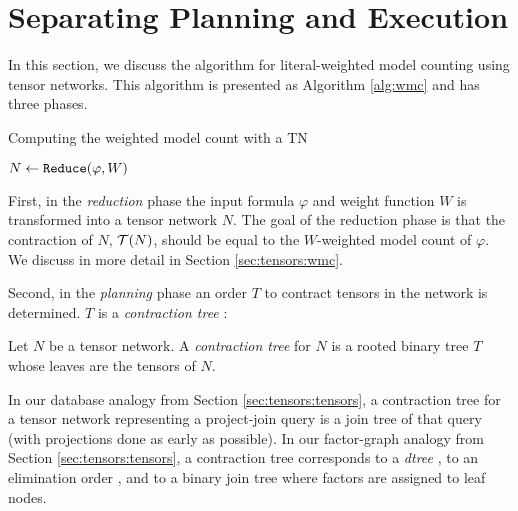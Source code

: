 \section{Separating Planning and Execution}
\label{sec:tensors:algorithm}
In this section, we discuss the algorithm for literal-weighted model counting using tensor networks. This algorithm is presented as Algorithm \ref{alg:wmc} and has three phases.

\begin{algorithm*}[t]
    \caption{Computing the weighted model count with a TN}
    \label{alg:wmc}
    \DontPrintSemicolon
    $N \gets \texttt{\upshape Reduce}(\varphi, W)$\;
\end{algorithm*}

First, in the \emph{reduction} phase the input formula $\varphi$ and weight function $W$ is transformed into a tensor network $N$. The goal of the reduction phase is that the contraction of $N$, $\mathcal{T}(N)$, should be equal to the $W$-weighted model count of $\varphi$. We discuss in more detail in Section \ref{sec:tensors:wmc}.

Second, in the \emph{planning} phase an order $T$ to contract tensors in the network is determined.
$T$ is a \emph{contraction tree} \cite{EP14}:
\begin{definition} \label{def:contraction-tree}
	Let $N$ be a tensor network. A \emph{contraction tree} for $N$ is a rooted binary tree $T$ whose leaves are the tensors of $N$. %
\end{definition}

In our database analogy from Section \ref{sec:tensors:tensors}, a contraction tree for a tensor network representing a project-join query is a join tree of that query (with projections done as early as possible). 
In our factor-graph analogy from Section \ref{sec:tensors:tensors}, a contraction tree corresponds to a \emph{dtree} \cite{darwiche01}, to an elimination order \cite{darwiche01b}, and to a binary join tree \cite{shenoy97} where factors are assigned to leaf nodes.

